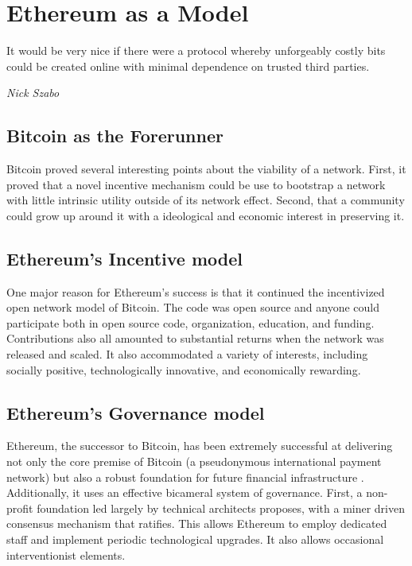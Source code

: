 \documentclass{article}
\begin{document}
\section{Ethereum as a Model}

\epigraph{It would be very nice if there were a protocol whereby unforgeably costly bits could be created online with minimal dependence on trusted third parties.\cite{szabobitgold}}{\textit{Nick Szabo}}

\subsection {Bitcoin as the Forerunner}

Bitcoin proved several interesting points about the viability of a network. First, it proved that a novel incentive mechanism could be use to bootstrap a network with little intrinsic utility outside of its network effect. Second, that a community could grow up around it with a ideological and economic interest in preserving it.

\subsection {Ethereum's Incentive model
}

One major reason for Ethereum's success is that it continued the incentivized open network model of Bitcoin. The code was open source and anyone could participate both in open source code, organization, education, and funding. Contributions also all amounted to substantial returns when the network was released and scaled. It also accommodated a variety of interests, including socially positive, technologically innovative, and economically rewarding.

\subsection {Ethereum's Governance model}

Ethereum, the successor to Bitcoin, has been extremely successful at delivering not only the core premise of Bitcoin (a pseudonymous international payment network) but also a robust foundation for future financial infrastructure . Additionally, it uses an effective bicameral system of governance. First, a non-profit foundation led largely by technical architects proposes, with a miner driven consensus mechanism that ratifies. This allows Ethereum to employ dedicated staff and implement periodic technological upgrades. It also allows occasional interventionist elements.
\end{document}

